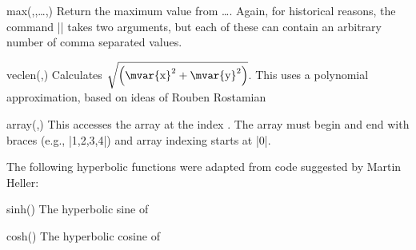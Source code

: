 \begin{math-function}{max(,,\ldots,)}
    Return the maximum value from \ldots{}. Again, for
    historical reasons, the command |\pgfmathmax| takes two arguments, but each
    of these can contain an arbitrary number of comma separated values.
\begin{codeexample}[]
 \pgfmathresult
\end{codeexample}
\end{math-function}

\begin{math-function}{veclen(,)}
\mathcommand
    Calculates $\sqrt{\left(\textrm{\mvar{x}}^2+\textrm{\mvar{y}}^2\right)}$.
    This uses a polynomial approximation, based on ideas of Rouben Rostamian
\begin{codeexample}[]
 \pgfmathresult
\end{codeexample}
\end{math-function}

\begin{math-function}{array(,)}
\mathcommand
    This accesses the array  at the index . The array must
    begin and end with braces (e.g., |{1,2,3,4}|) and array indexing starts at
    |0|.
\begin{codeexample}[]
 \pgfmathresult
\end{codeexample}
\end{math-function}

The following hyperbolic functions were adapted from code suggested by Martin
Heller:

\begin{math-function}{sinh()}
\mathcommand
    The hyperbolic sine of 
\begin{codeexample}[]
 \pgfmathresult
\end{codeexample}
\end{math-function}

\begin{math-function}{cosh()}
\mathcommand
    The hyperbolic cosine of 
\begin{codeexample}[]
 \pgfmathresult
\end{codeexample}
\end{math-function}

